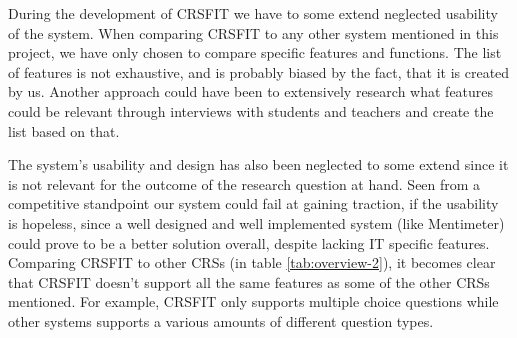 During the development of CRSFIT we have to some extend neglected usability of the system. When comparing CRSFIT to any other system mentioned in this project, we have only chosen to compare specific features and functions. The list of features is not exhaustive, and is probably biased by the fact, that it is created by us. Another approach could have been to extensively research what features could be relevant through interviews with students and teachers and create the list based on that.

The system's usability and design has also been neglected to some extend since it is not relevant for the outcome of the research question at hand. Seen from a competitive standpoint our system could fail at gaining traction, if the usability is hopeless, since a well designed and well implemented system (like Mentimeter) could prove to be a better solution overall, despite lacking IT specific features. Comparing CRSFIT to other CRSs (in table \ref{tab:overview-2}), it becomes clear that CRSFIT doesn't support all the same features as some of the other CRSs mentioned. For example, CRSFIT only supports multiple choice questions while other systems supports a various amounts of different question types.








